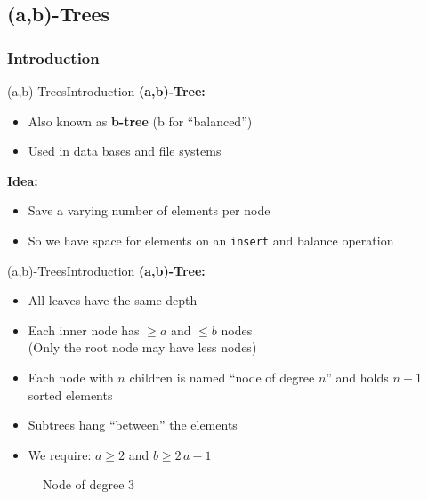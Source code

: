 \subsection{(a,b)-Trees}
\subsubsection{Introduction}

\begin{frame}{(a,b)-Trees}{Introduction}
  \textbf{(a,b)-Tree:}
  \begin{itemize}
    \item<2->
      Also known as \textbf{b-tree} (b for \enquote{balanced})
    \item<3->
      Used in data bases and file systems
  \end{itemize}
  \textbf{Idea:}
  \begin{itemize}
    \item<5->
      Save a varying number of elements per node
    \item<6->
      So we have space for elements on an \texttt{\color{Mittel-Blau}insert}
      and balance operation
  \end{itemize}
\end{frame}


\begin{frame}{(a,b)-Trees}{Introduction}
  \textbf{(a,b)-Tree:}
  \begin{itemize}
    \item<2->
      All leaves have the same depth
    \item<3->
      Each inner node has {\color{Mittel-Blau}$\geq a$} and
      {\color{Mittel-Blau}$\leq b$} nodes\\
      (Only the root node may have less nodes)
    \item<4->
      Each node with $n$ children is named \enquote{node of degree $n$} and
      holds $n-1$ sorted elements
    \item<5->
      Subtrees hang \enquote{between} the elements
    \item<6->
      We require: {\color{Mittel-Blau}$a \geq 2$} and
      {\color{Mittel-Blau}$b \geq 2\,a - 1$}
  \end{itemize}
  \begin{figure}
    \begin{adjustbox}{width=0.3\linewidth}
      
    \end{adjustbox}
    \caption{Node of degree 3}
    \label{fig:a_b_tree:node_introduction}
  \end{figure}
\end{frame}

